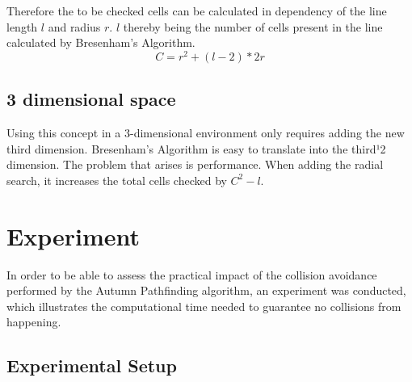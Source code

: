 Therefore the to be checked cells can be calculated in dependency of the line length $l$ and radius $r$. $l$ thereby being the number of cells present in the line calculated by Bresenham's Algorithm. 
\[C=r^2+(l-2)*2r\]

\subsection{3 dimensional space}
Using this concept in a 3-dimensional environment only requires adding the new third dimension. Bresenham's Algorithm is easy to translate into the third¹2 dimension. The problem that arises is performance. When adding the radial search, it increases the total cells checked by \(C^2 - l\).  

\section{Experiment}

In order to be able to assess the practical impact of the collision avoidance performed by the Autumn Pathfinding algorithm, an experiment was conducted, which illustrates the computational time needed to guarantee no collisions from happening.


\subsection{Experimental Setup}

